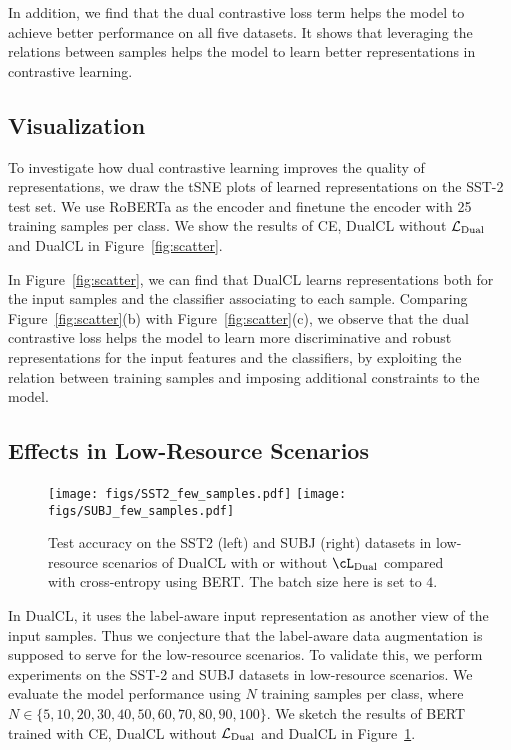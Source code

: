 In addition, we find that the dual contrastive loss term helps the model to achieve better performance on all five datasets. It shows that leveraging the relations between samples helps the model to learn better representations in contrastive learning.

\subsection{Visualization}

To investigate how dual contrastive learning improves the quality of representations, we draw the tSNE plots of learned representations on the SST-2 test set. We use RoBERTa as the encoder and finetune the encoder with 25 training samples per class. We show the results of CE, DualCL without $\mathcal{L}_{\rm Dual}$ and DualCL in Figure~\ref{fig:scatter}.

In Figure~\ref{fig:scatter}, we can find that DualCL learns representations both for the input samples and the classifier associating to each sample. Comparing Figure~\ref{fig:scatter}(b) with Figure~\ref{fig:scatter}(c), we observe that the dual contrastive loss helps the model to learn more discriminative and robust representations for the input features and the classifiers, by exploiting the relation between training samples and imposing additional constraints to the model.

\subsection{Effects in Low-Resource Scenarios}

\begin{figure}[t]
    \centering
    \texttt{[image: figs/SST2\_few\_samples.pdf]}
    \texttt{[image: figs/SUBJ\_few\_samples.pdf]}
    \caption{Test accuracy on the SST2 (left) and SUBJ (right) datasets in low-resource scenarios of DualCL with or without $\cL_{\rm Dual}$ compared with cross-entropy using BERT. The batch size here is set to $4$.}
    \label{fig:few_data}
\end{figure}

In DualCL, it uses the label-aware input representation as another view of the input samples. Thus we conjecture that the label-aware data augmentation is supposed to serve for the low-resource scenarios. To validate this, we perform experiments on the SST-2 and SUBJ datasets in low-resource scenarios. We evaluate the model performance using $N$ training samples per class, where $N\in\{5,10,20,30,40,50,60,70,80,90,100\}$. We sketch the results of BERT trained with CE, DualCL without $\mathcal{L}_{\rm Dual}$ and DualCL in Figure~\ref{fig:few_data}.

